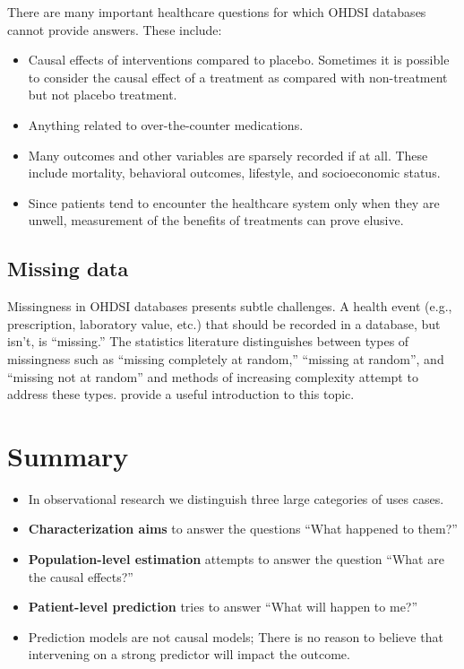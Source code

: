 \documentclass[11pt]{book}
\providecommand{\tightlist}{%
  \setlength{\itemsep}{0pt}\setlength{\parskip}{0pt}}
\let\BeginKnitrBlock\begin \let\EndKnitrBlock\end
\begin{document}
There are many important healthcare questions for which OHDSI databases
cannot provide answers. These include:

\begin{itemize}
\tightlist
\item
  Causal effects of interventions compared to placebo. Sometimes it is
  possible to consider the causal effect of a treatment as compared with
  non-treatment but not placebo treatment.
\item
  Anything related to over-the-counter medications.
\item
  Many outcomes and other variables are sparsely recorded if at all.
  These include mortality, behavioral outcomes, lifestyle, and
  socioeconomic status.
\item
  Since patients tend to encounter the healthcare system only when they
  are unwell, measurement of the benefits of treatments can prove
  elusive.
\end{itemize}

\subsection{Missing data}\label{missing-data}

Missingness in OHDSI databases presents subtle challenges. A health
event (e.g., prescription, laboratory value, etc.) that should be
recorded in a database, but isn't, is ``missing.'' The statistics
literature distinguishes between types of missingness such as ``missing
completely at random,'' ``missing at random'', and ``missing not at
random'' and methods of increasing complexity attempt to address these
types. \citet{perkins2017principled} provide a useful introduction to
this topic.

\section{Summary}\label{summary-1}

\BeginKnitrBlock{rmdsummary}
\begin{itemize}
\item
  In observational research we distinguish three large categories of
  uses cases.
\item
  \textbf{Characterization aims} to answer the questions ``What happened
  to them?''
\item
  \textbf{Population-level estimation} attempts to answer the question
  ``What are the causal effects?''
\item
  \textbf{Patient-level prediction} tries to answer ``What will happen
  to me?''
\item
  Prediction models are not causal models; There is no reason to believe
  that intervening on a strong predictor will impact the outcome.
\end{itemize}
\EndKnitrBlock{rmdsummary}
\end{document}
